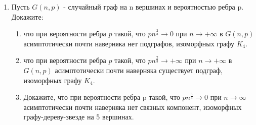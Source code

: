 \documentclass[a4paper, 14pt]{extarticle}
\begin{document}
\begin{enumerate}
\item Пусть $G(n,p)$ - случайный граф на n вершинах и вероятностью ребра p. Докажите: 
\begin{enumerate}
    \item что при вероятности ребра $p$ такой, что $pn^{\frac{2}{3}}\to 0$ при $n\to +\infty$ в $G(n,p)$ асимптотически почти наверняка нет подграфов, изоморфных графу $K_4$.
    \item что при вероятности ребра $p$ такой, что $pn^{\frac{2}{3}}\to +\infty$ при $n\to +\infty$ в $G(n,p)$ асимптотически почти наверняка существует подграф, изоморфных графу $K_4$.
    \item Докажите, что при вероятности ребра p такой, что $pn^{\frac{5}{4}} \to 0$ при $n \to \infty$ асимптотически почти наверняка нет связных компонент, изоморфных графу-дереву-звезде на 5 вершинах. 
\end{enumerate}

\end{enumerate}
\newpage
\end{document}
